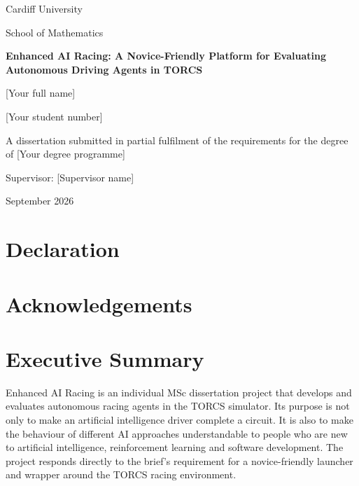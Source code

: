 \documentclass[12pt,a4paper]{article}
\numberwithin{figure}{section}
\numberwithin{table}{section}
\newcommand{\dissertationtitle}{Enhanced AI Racing: A Novice-Friendly Platform for Evaluating Autonomous Driving Agents in TORCS}
\newcommand{\authorname}{[Your full name]}
\newcommand{\studentnumber}{[Your student number]}
\newcommand{\degreeprogramme}{[Your degree programme]}
\newcommand{\supervisorname}{[Supervisor name]}
\begin{document}
\begin{titlepage}
  \centering
  {\Large Cardiff University\par}
  \vspace{0.5cm}
  {\large School of Mathematics\par}
  \vfill
  {\Huge\bfseries \dissertationtitle\par}
  \vspace{1.5cm}
  {\Large \authorname\par}
  \vspace{0.4cm}
  {\large \studentnumber\par}
  \vfill
  {\large A dissertation submitted in partial fulfilment of the requirements for the degree of \degreeprogramme\par}
  \vspace{0.5cm}
  {\large Supervisor: \supervisorname\par}
  \vspace{0.5cm}
  {\large September 2026\par}
\end{titlepage}


\section*{Declaration}

\section*{Acknowledgements}

\section*{Executive Summary}

Enhanced AI Racing is an individual MSc dissertation project that develops and evaluates autonomous racing agents in the TORCS simulator. Its purpose is not only to make an artificial intelligence driver complete a circuit. It is also to make the behaviour of different AI approaches understandable to people who are new to artificial intelligence, reinforcement learning and software development. The project responds directly to the brief's requirement for a novice-friendly launcher and wrapper around the TORCS racing environment.
\end{document}
